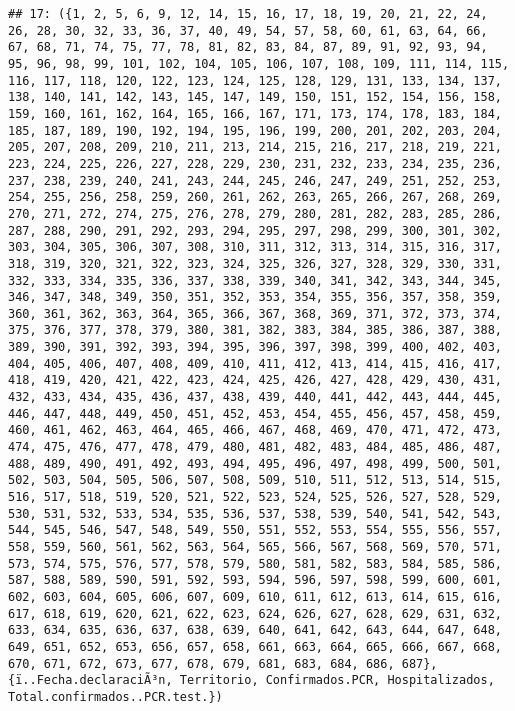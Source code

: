 \documentclass[
]{book}
\begin{document}
\begin{verbatim}
## 17: ({1, 2, 5, 6, 9, 12, 14, 15, 16, 17, 18, 19, 20, 21, 22, 24, 26, 28, 30, 32, 33, 36, 37, 40, 49, 54, 57, 58, 60, 61, 63, 64, 66, 67, 68, 71, 74, 75, 77, 78, 81, 82, 83, 84, 87, 89, 91, 92, 93, 94, 95, 96, 98, 99, 101, 102, 104, 105, 106, 107, 108, 109, 111, 114, 115, 116, 117, 118, 120, 122, 123, 124, 125, 128, 129, 131, 133, 134, 137, 138, 140, 141, 142, 143, 145, 147, 149, 150, 151, 152, 154, 156, 158, 159, 160, 161, 162, 164, 165, 166, 167, 171, 173, 174, 178, 183, 184, 185, 187, 189, 190, 192, 194, 195, 196, 199, 200, 201, 202, 203, 204, 205, 207, 208, 209, 210, 211, 213, 214, 215, 216, 217, 218, 219, 221, 223, 224, 225, 226, 227, 228, 229, 230, 231, 232, 233, 234, 235, 236, 237, 238, 239, 240, 241, 243, 244, 245, 246, 247, 249, 251, 252, 253, 254, 255, 256, 258, 259, 260, 261, 262, 263, 265, 266, 267, 268, 269, 270, 271, 272, 274, 275, 276, 278, 279, 280, 281, 282, 283, 285, 286, 287, 288, 290, 291, 292, 293, 294, 295, 297, 298, 299, 300, 301, 302, 303, 304, 305, 306, 307, 308, 310, 311, 312, 313, 314, 315, 316, 317, 318, 319, 320, 321, 322, 323, 324, 325, 326, 327, 328, 329, 330, 331, 332, 333, 334, 335, 336, 337, 338, 339, 340, 341, 342, 343, 344, 345, 346, 347, 348, 349, 350, 351, 352, 353, 354, 355, 356, 357, 358, 359, 360, 361, 362, 363, 364, 365, 366, 367, 368, 369, 371, 372, 373, 374, 375, 376, 377, 378, 379, 380, 381, 382, 383, 384, 385, 386, 387, 388, 389, 390, 391, 392, 393, 394, 395, 396, 397, 398, 399, 400, 402, 403, 404, 405, 406, 407, 408, 409, 410, 411, 412, 413, 414, 415, 416, 417, 418, 419, 420, 421, 422, 423, 424, 425, 426, 427, 428, 429, 430, 431, 432, 433, 434, 435, 436, 437, 438, 439, 440, 441, 442, 443, 444, 445, 446, 447, 448, 449, 450, 451, 452, 453, 454, 455, 456, 457, 458, 459, 460, 461, 462, 463, 464, 465, 466, 467, 468, 469, 470, 471, 472, 473, 474, 475, 476, 477, 478, 479, 480, 481, 482, 483, 484, 485, 486, 487, 488, 489, 490, 491, 492, 493, 494, 495, 496, 497, 498, 499, 500, 501, 502, 503, 504, 505, 506, 507, 508, 509, 510, 511, 512, 513, 514, 515, 516, 517, 518, 519, 520, 521, 522, 523, 524, 525, 526, 527, 528, 529, 530, 531, 532, 533, 534, 535, 536, 537, 538, 539, 540, 541, 542, 543, 544, 545, 546, 547, 548, 549, 550, 551, 552, 553, 554, 555, 556, 557, 558, 559, 560, 561, 562, 563, 564, 565, 566, 567, 568, 569, 570, 571, 573, 574, 575, 576, 577, 578, 579, 580, 581, 582, 583, 584, 585, 586, 587, 588, 589, 590, 591, 592, 593, 594, 596, 597, 598, 599, 600, 601, 602, 603, 604, 605, 606, 607, 609, 610, 611, 612, 613, 614, 615, 616, 617, 618, 619, 620, 621, 622, 623, 624, 626, 627, 628, 629, 631, 632, 633, 634, 635, 636, 637, 638, 639, 640, 641, 642, 643, 644, 647, 648, 649, 651, 652, 653, 656, 657, 658, 661, 663, 664, 665, 666, 667, 668, 670, 671, 672, 673, 677, 678, 679, 681, 683, 684, 686, 687}, {ï..Fecha.declaraciÃ³n, Territorio, Confirmados.PCR, Hospitalizados, Total.confirmados..PCR.test.})

\end{verbatim}
\end{document}
